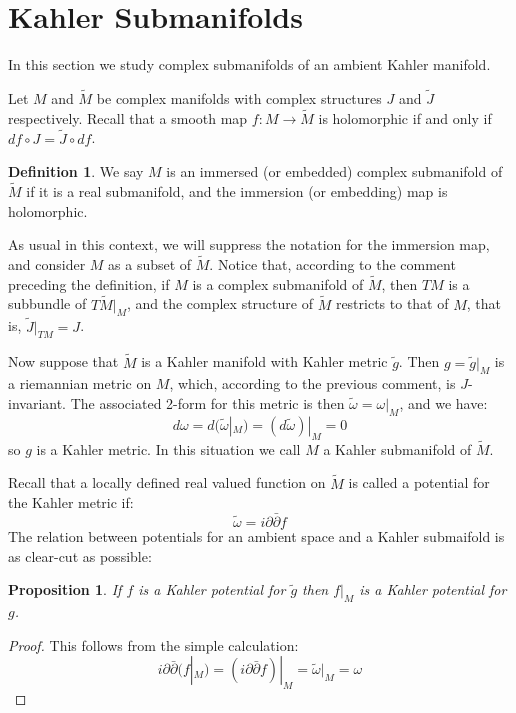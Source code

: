 \documentclass[11pt]{amsart}
\newtheorem{prop}[subsection]{Proposition}
\def \Mamb{ \tilde{M} }
\def \Jamb{ \tilde{J} }
\def \gamb{ \tilde{g} }
\def \omegaamb{ \tilde{\omega} }
\def \del{ \partial }
\def \delbar{ \bar{\partial} }
\theoremstyle{definition}
\newtheorem{definition}[subsection]{Definition}
\begin{document}
\parskip 6pt
\parindent 0pt
\baselineskip 14pt

\section{ Kahler Submanifolds }

In this section we study complex submanifolds of an ambient Kahler manifold.

Let $M$ and $\Mamb$ be complex manifolds with complex structures $J$ and $\Jamb$ respectively.  Recall that a smooth map $f:M \rightarrow \Mamb$ is holomorphic if and only if $df \circ J = \Jamb \circ df$.

\begin{definition} We say $M$ is an immersed (or embedded) complex submanifold of $\Mamb$ if it is a real submanifold, and the immersion (or embedding) map is holomorphic.
\end{definition}

As usual in this context, we will suppress the notation for the immersion map, and consider $M$ as a subset of $\Mamb$.  Notice that, according to the comment preceding the definition, if $M$ is a complex submanifold of $\Mamb$, then $TM$ is a subbundle of $T \Mamb|_{M}$, and the complex structure of $\Mamb$ restricts to that of $M$, that is, $\Jamb |_{TM} = J$.

Now suppose that $\Mamb$ is a Kahler manifold with Kahler metric $\gamb$.  Then $g = \gamb |_{M}$ is a riemannian metric on $M$, which, according to the previous comment, is $J$-invariant.  The associated 2-form for this metric is then $ \omegaamb = \omega |_{M} $, and we have:
%
$$ d \omega = d ( \omegaamb |_{M} ) = ( d \omegaamb )|_{M} = 0 $$
%
so $g$ is a Kahler metric.  In this situation we call $M$ a Kahler submanifold of $\Mamb$.

Recall that a locally defined real valued function on $\Mamb$ is called a potential for the Kahler metric if:
%
$$ \omegaamb = i \del \delbar f $$
%
The relation between potentials for an ambient space and a Kahler submaifold is as clear-cut as possible:

\begin{prop} If $f$ is a Kahler potential for $\gamb$ then $f|_{M}$ is a Kahler potential for $g$.
\end{prop}

\begin{proof} This follows from the simple calculation:
%
$$ i \del \delbar ( f|_{M} ) = ( i \del \delbar f )|_{M} = \omegaamb |_{M} = \omega $$
%
\end{proof}
\end{document}
